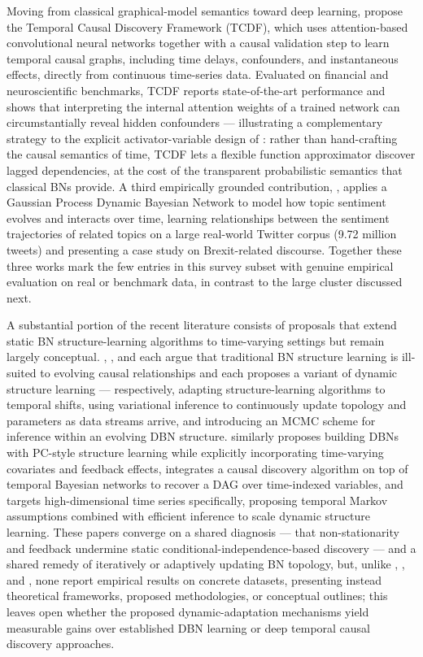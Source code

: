 Moving from classical graphical-model semantics toward deep learning, \cite{nauta2019causal} propose the Temporal Causal Discovery Framework (TCDF), which uses attention-based convolutional neural networks together with a causal validation step to learn temporal causal graphs, including time delays, confounders, and instantaneous effects, directly from continuous time-series data. Evaluated on financial and neuroscientific benchmarks, TCDF reports state-of-the-art performance and shows that interpreting the internal attention weights of a trained network can circumstantially reveal hidden confounders --- illustrating a complementary strategy to the explicit activator-variable design of \cite{motzek2017indirect}: rather than hand-crafting the causal semantics of time, TCDF lets a flexible function approximator discover lagged dependencies, at the cost of the transparent probabilistic semantics that classical BNs provide. A third empirically grounded contribution, \cite{liang2020dynamic}, applies a Gaussian Process Dynamic Bayesian Network to model how topic sentiment evolves and interacts over time, learning relationships between the sentiment trajectories of related topics on a large real-world Twitter corpus (9.72 million tweets) and presenting a case study on Brexit-related discourse. Together these three works mark the few entries in this survey subset with genuine empirical evaluation on real or benchmark data, in contrast to the large cluster discussed next.

A substantial portion of the recent literature consists of proposals that extend static BN structure-learning algorithms to time-varying settings but remain largely conceptual. \cite{zhang2026causal}, \cite{zhang2026causalb}, and \cite{zhang2026dynamicb} each argue that traditional BN structure learning is ill-suited to evolving causal relationships and each proposes a variant of dynamic structure learning --- respectively, adapting structure-learning algorithms to temporal shifts, using variational inference to continuously update topology and parameters as data streams arrive, and introducing an MCMC scheme for inference within an evolving DBN structure. \cite{zhang2026causali} similarly proposes building DBNs with PC-style structure learning while explicitly incorporating time-varying covariates and feedback effects, \cite{zhang2026temporal} integrates a causal discovery algorithm on top of temporal Bayesian networks to recover a DAG over time-indexed variables, and \cite{zhang2026causalk} targets high-dimensional time series specifically, proposing temporal Markov assumptions combined with efficient inference to scale dynamic structure learning. These papers converge on a shared diagnosis --- that non-stationarity and feedback undermine static conditional-independence-based discovery --- and a shared remedy of iteratively or adaptively updating BN topology, but, unlike \cite{motzek2017indirect}, \cite{nauta2019causal}, and \cite{liang2020dynamic}, none report empirical results on concrete datasets, presenting instead theoretical frameworks, proposed methodologies, or conceptual outlines; this leaves open whether the proposed dynamic-adaptation mechanisms yield measurable gains over established DBN learning or deep temporal causal discovery approaches.


